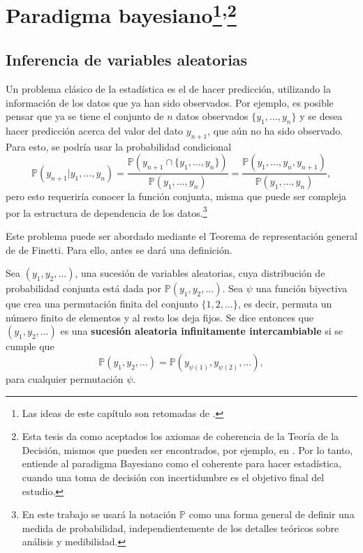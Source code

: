 \chapter[Paradigma Bayesiano]{Paradigma bayesiano\footnote{Las ideas de este cap\'itulo son retomadas de \cite{Denison_BayesMethods}.}\textsuperscript{,}\footnote{Esta tesis da como aceptados los axiomas de coherencia de la Teoría de la Decisión, mismos que pueden ser encontrados, por ejemplo, en \cite{Fishburn_Axioms}. Por lo tanto, entiende al paradigma Bayesiano como el coherente para hacer estad\'istica, cuando una toma de decisi\'on con incertidumbre es el objetivo final del estudio. 
}}

\section{Inferencia de variables aleatorias}

Un problema clásico de la estad\'istica es el de hacer predicci\'on, utilizando la informaci\'on de los datos que ya han sido observados. Por ejemplo, es posible pensar que ya se tiene el conjunto de $n$ datos observados $\{y_1, \ldots, y_n\}$ y se desea hacer predicci\'on acerca del valor del dato $y_{n+1}$, que a\'un no ha sido observado. Para esto, se podr\'ia usar la probabilidad condicional
\begin{equation*}
    \mathbb{P}(y_{n+1}|y_1,\ldots,y_n) =
    \frac{\mathbb{P}(y_{n+1} \cap \{y_1, \ldots, y_n\})}{\mathbb{P}(y_1, \ldots, y_n)} =
    \frac{\mathbb{P}(y_1, \ldots, y_n,y_{n+1})}{\mathbb{P}(y_1, \ldots, y_n)},
\end{equation*}
pero esto requerir\'ia conocer la funci\'on conjunta, misma que puede ser compleja por la estructura de dependencia de los datos.\footnote{En este trabajo se usar\'a la notaci\'on $\mathbb{P}$ como una forma general de definir una medida de probabilidad, independientemente de los detalles te\'oricos sobre an\'alisis y medibilidad.}

Este problema puede ser abordado mediante el Teorema de representaci\'on general de de Finetti. Para ello, antes se dar\'a una definici\'on.

\begin{defin*}
    Sea $(y_1,y_2,\ldots)$, una sucesi\'on de variables aleatorias, cuya distribuci\'on de probabilidad conjunta est\'a dada por $\mathbb{P}(y_1,y_2,\ldots)$. Sea $\psi$ una funci\'on biyectiva que crea una permutaci\'on finita del conjunto $\{1,2,\ldots\}$, es decir, permuta un n\'umero finito de elementos y al resto los deja fijos.  
    Se dice entonces que $(y_1,y_2,\ldots)$ es una \textbf{sucesi\'on aleatoria infinitamente intercambiable} si se cumple que 
    \begin{equation*}
        \mathbb{P}(y_1,y_2,\ldots) = \mathbb{P}(y_{\psi(1)},y_{\psi(2)},\ldots),
    \end{equation*}
    para cualquier permutaci\'on $\psi$.
\end{defin*}

